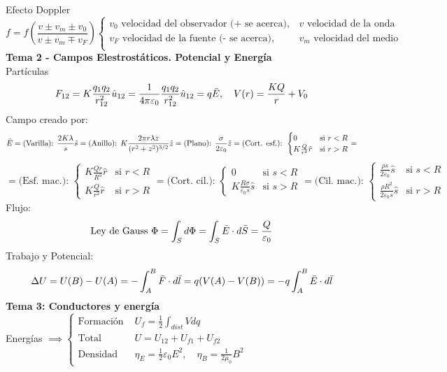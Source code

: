 \documentclass{article}
\newcommand{\h}{\hspace{1em}}
\begin{document}
Efecto Doppler \\
\[
f = f\left( \frac{v\pm v_m \pm v_0}{v \pm v_m \mp v_F} \right)
\begin{cases}
    v_0 \text{ velocidad del observador (+ se acerca)}, &  v \text{ velocidad de la onda}\\
    v_F \text{ velocidad de la fuente (- se acerca)}, & v_m \text{ velocidad del medio}\\
\end{cases}
\]
\textbf{Tema 2 - Campos Elestrostáticos. Potencial y Energía} \\
Partículas \\
\[
F_{12} = K\frac{q_1q_2}{r_{12}^2}\hat{u}_{12} = \frac{1}{4\pi \varepsilon_0}\frac{q_1q_2}{r_{12}^2}\hat{u}_{12} = q\Bar{E}, \hspace{1em}
V(r) = \frac{KQ}{r} +V_0
\]
Campo creado por: \\
\[ \Bar{E}= \text{(Varilla): } \frac{2K\lambda}{s}\hat{s}= 
\text{(Anillo): } K\frac{2\pi r\lambda z}{(r^2+z^2)^{3/2}}\hat{z}=
\text{(Plano): } \frac{\sigma}{2\varepsilon_0}\hat{z}=
\text{(Cort. esf.): } \begin{cases}
    0 & \text{si } r<R \\
    K\frac{Q}{r^2}\hat{r} & \text{si } r>R
\end{cases} = 
\]
\[
 = \text{(Esf. mac.): } \begin{cases}
    K\frac{Qr}{R^3}\hat{r} & \text{si } r<R \\
    K\frac{Q}{r^2}\hat{r} & \text{si } r>R
\end{cases} = 
\text{(Cort. cil.): } \begin{cases}
    0 & \text{si } s<R \\
    K\frac{R\sigma}{\varepsilon_0 s}\hat{s} & \text{si } s>R
\end{cases}
=
\text{(Cil. mac.): } \begin{cases}
    \frac{\rho s}{2\varepsilon_0}\hat{s} & \text{si } s<R \\
    \frac{\rho R^2}{2\varepsilon_0 s}\hat{s} & \text{si } r>R
\end{cases}
\]
Flujo: \\
\[\text{Ley de Gauss } \Phi = \int_S d\Phi = \int_S \Bar{E}\cdot d\Bar{S} = \frac{Q}{\varepsilon_0}
\]
Trabajo y Potencial:
\[
\Delta U = U(B)-U(A) = -\int_A^B \Bar{F}\cdot d\Bar{l}  = q (V(A)-V(B)) = -q\int_A^B \Bar{E}\cdot d\Bar{l}
\]
\textbf{Tema 3: Conductores y energía}\\
Energías $\implies
\begin{cases}
    \text{Formación }  & U_f = \frac{1}{2}\int_{dist}Vdq \\
    \text{Total }      & U = U_{12} + U_{f1} + U_{f2} \\
    \text{Densidad }   & \eta_E = \frac{1}{2}\varepsilon_0E^2, \h \eta_B = \frac{1}{2\mu_0}B^2
\end{cases}$
\end{document}
